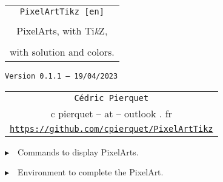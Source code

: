 \documentclass{article}
\def\TPversion{0.1.1}
\def\TPdate{19/04/2023}
\begin{document}
\pagestyle{fancy}

\thispagestyle{empty}

\vspace{2cm}

\begin{center}
	\begin{minipage}{0.75\linewidth}
	\begin{tcolorbox}[colframe=yellow,colback=yellow!15]
		\begin{center}
			\begin{tabular}{c}
				{\Huge \texttt{PixelArtTikz [en]}}\\
				\\
				{\LARGE PixelArts, with Ti\textit{k}Z}, \\
				\\
				{\LARGE with solution and colors.} \\
			\end{tabular}
			
			\medskip
			
			{\small \texttt{Version \TPversion{} -- \TPdate}}
		\end{center}
	\end{tcolorbox}
\end{minipage}
\end{center}

\vspace{0.5cm}

\begin{center}
	\begin{tabular}{c}
	\texttt{Cédric Pierquet}\\
	{\ttfamily c pierquet -- at -- outlook . fr}\\
	\texttt{\url{https://github.com/cpierquet/PixelArtTikz}}
\end{tabular}
\end{center}

\vspace{0.25cm}

{$\blacktriangleright$~~Commands to display PixelArts.}

\smallskip

{$\blacktriangleright$~~Environment to complete the PixelArt.}

\smallskip

\vspace{1cm}
\end{document}
